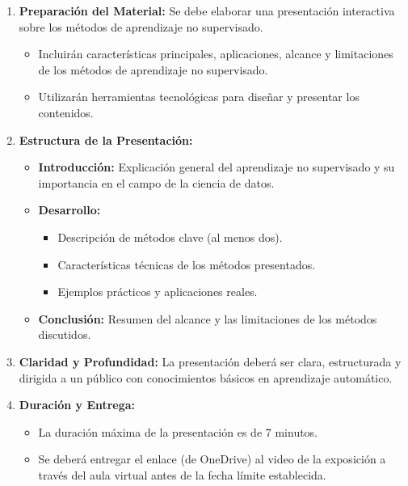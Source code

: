 \documentclass[a4,11pt]{aleph-notas}
\begin{document}
\begin{enumerate}[leftmargin=*]
    \item \textbf{Preparación del Material:} Se debe elaborar una presentación interactiva sobre los métodos de aprendizaje no supervisado.
    \begin{itemize}
        \item Incluirán características principales, aplicaciones, alcance y limitaciones de los métodos de aprendizaje no supervisado.
        \item Utilizarán herramientas tecnológicas para diseñar y presentar los contenidos.
    \end{itemize}
    \item \textbf{Estructura de la Presentación:}
    \begin{itemize}[leftmargin=*]
        \item \textbf{Introducción:} Explicación general del aprendizaje no supervisado y su importancia en el campo de la ciencia de datos.
        \item \textbf{Desarrollo:}
        \begin{itemize}
            \item Descripción de métodos clave (al menos dos).
            \item Características técnicas de los métodos presentados.
            \item Ejemplos prácticos y aplicaciones reales.
        \end{itemize}
        \item \textbf{Conclusión:} Resumen del alcance y las limitaciones de los métodos discutidos.
    \end{itemize}
    \item \textbf{Claridad y Profundidad:} La presentación deberá ser clara, estructurada y dirigida a un público con conocimientos básicos en aprendizaje automático.
    \item \textbf{Duración y Entrega:} 
    \begin{itemize}
        \item La duración máxima de la presentación es de 7 minutos.
        \item Se deberá entregar el enlace (de OneDrive) al video de la exposición a través del aula virtual antes de la fecha límite establecida.
    \end{itemize}
\end{enumerate}
\end{document}

